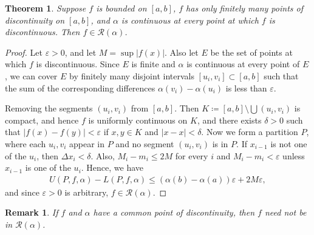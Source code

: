 \documentclass[10pt]{book}
\newtheorem{theorem}{Theorem}[chapter]
\newtheorem{remark}{Remark}[chapter]
\theoremstyle{definition}
\numberwithin{equation}{chapter}
\begin{document}
\begin{theorem}
Suppose $f$ is bounded on $[a,b]$, $f$ has only finitely many points of discontinuity on $[a,b]$, and $\alpha$ is continuous at every point at which $f$ is discontinuous. Then $f \in \mathscr{R}(\alpha)$.
\end{theorem}
\begin{proof}
Let $\varepsilon > 0$, and let $M = \sup \left|f(x)\right|$. Also let $E$ be the set of points at which $f$ is discontinuous. Since $E$ is finite and $\alpha$ is continuous at every point of $E$, we can cover $E$ by finitely many disjoint intervals $[u_i,v_i] \subset [a,b]$ such that the sum of the corresponding differences $\alpha(v_i) - \alpha(u_i)$ is less than $\varepsilon$. 

Removing the segments $(u_i,v_i)$ from $[a,b]$. Then $K \coloneqq [a,b] \setminus \bigcup (u_i,v_i)$ is compact, and hence $f$ is uniformly continuous on $K$, and there exists $\delta > 0$ such that $\left|f(x) - f(y)\right| < \varepsilon$ if $x,y \in K$ and $\left|x - x\right| < \delta$. Now we form a partition $P$, where each $u_i,v_i$ appear in $P$ and no segment $(u_i,v_i)$ is in $P$. If $x_{i-1}$ is not one of the $u_i$, then $\Delta x_i < \delta$. 
Also, $M_i - m_i \leq 2M$ for every $i$ and $M_i - m_i < \varepsilon$ unless $x_{i-1}$ is one of the $u_i$. Hence, we have
\begin{align*}
    U(P,f,\alpha) - L(P,f,\alpha) \leq \left(\alpha(b) - \alpha(a)\right) \varepsilon + 2M \varepsilon,
\end{align*}
and since $\varepsilon > 0$ is arbitrary, $f \in \mathscr{R}(\alpha)$.
\end{proof}

\begin{remark}
If $f$ and $\alpha$ have a common point of discontinuity, then $f$ need not be in $\mathscr{R}(\alpha)$.
\end{remark}

\medskip
\end{document}
